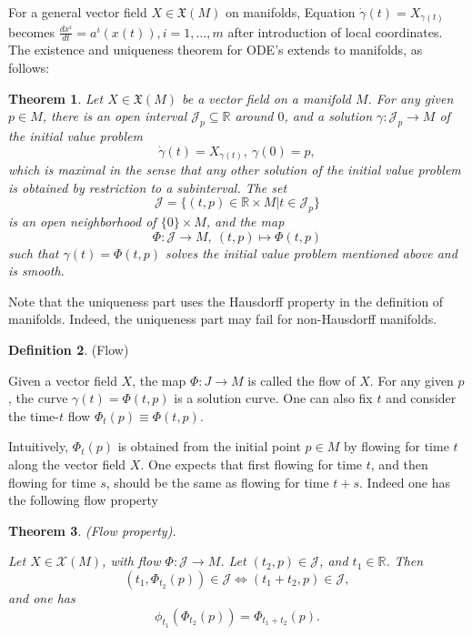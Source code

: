 \documentclass{article}
\newtheorem{theorem}{Theorem}[section]
\theoremstyle{definition}
\newtheorem{defn}[theorem]{Definition}
\newenvironment{definition}
  {\vspace{8pt}\begin{mdframed}[backgroundcolor=blueish,innertopmargin=4]\begin{defn}}
  {\end{defn}\end{mdframed}\vspace{4pt}}
\begin{document}
For a general vector field $X \in \mathfrak X(M)$ on manifolds, Equation $\dot{\gamma}(t) = X_{\gamma(t)}$ becomes $\frac{dx^i}{dt} = a^i (x(t)), i = 1,\dots,m$ after introduction of local coordinates. The existence and uniqueness theorem for ODE’s extends to manifolds, as follows:

\begin{theorem}

Let $X \in \mathfrak X(M)$ be a vector field on a manifold $M$. For any given $p \in M$, there is an open interval $\mathscr J_p \subseteq \mathbb R$ around $0$, and a solution $\gamma : \mathscr J_p \rightarrow M$ of the initial value problem 
\[
    \dot{\gamma}(t) = X_{\gamma(t)} ,\  \gamma(0) = p,
\]
which is maximal in the sense that any other solution of the initial value problem is obtained by restriction to a subinterval. The set 
\[
    \mathscr J = \{(t, p) \in\mathbb R \times M | t \in \mathscr J_p\}
\]
is an open neighborhood of $\{0\} \times M$, and the map 
\[
    \Phi : \mathscr J \rightarrow M,  \ (t, p) \mapsto  \Phi(t, p)
\]
such that $\gamma(t) = \Phi(t, p)$ solves the initial value problem mentioned above and is smooth.
\end{theorem}

Note that the uniqueness part uses the Hausdorff property in the definition of manifolds. Indeed, the uniqueness part may fail for non-Hausdorff manifolds.

\begin{definition} (Flow)

Given a vector field $X$, the map $\Phi : J \rightarrow M$ is called the flow of $X$. For any given $p$, the curve $\gamma(t) = \Phi(t, p)$ is a solution curve.  One can also fix $t$ and consider the time-$t$ flow $\Phi_t(p) \equiv \Phi(t, p).$
\end{definition}


Intuitively, $\Phi_t(p)$ is obtained from the initial point $p \in M$ by flowing for time $t$ along the vector field $X$. One expects that first flowing for time $t$, and then flowing for time $s$, should be the same as flowing for time $t +s$. Indeed one has the following
flow property

\begin{theorem}  (Flow property).

Let $X \in \mathscr X(M)$, with flow $\Phi : \mathscr J \rightarrow M$. Let $(t_2, p) \in \mathscr J$, and $t_1 \in \mathbb R$. Then 
\[ 
    (t_1,\Phi_{t_2} (p)) \in \mathscr J \iff (t_1 +t_2, p) \in \mathscr J,
\]
and one has 
\[
    \phi_{t_1} (\Phi_{t_2} (p)) = \Phi_{t_1+t_2} (p).
\]

\end{theorem}
\end{document}
